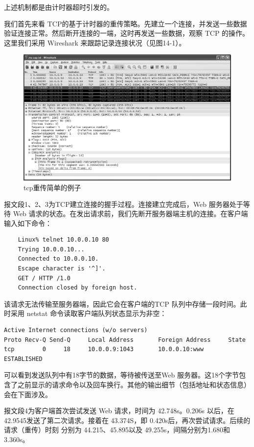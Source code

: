 上述机制都是由计时器超时引发的。

我们首先来看 TCP的基于计时器的重传策略。先建立一个连接，并发送一些数据验证连接正常。然后断开连接的一端，这时再发送一些数据，观察 TCP 的操作。这里我们采用
Wireshark 来跟踪记录连接状况（见图14-1）。

\begin{figure}[!htb]
	\includegraphics[width=1.0\textwidth]{imgs/14/14-1.png}
	\caption{tcp重传简单的例子}
\end{figure}

报文段1、2、3为TCP建立连接的握手过程。连接建立完成后，Web 服务器处于等待 Web 请求的状态。在发出请求前，我们先断开服务器端主机的连接。在客户端输入如下命令：
\begin{verbatim}
    Linux% telnet 10.0.0.10 80
    Trying 10.0.0.10...
    Connected to 10.0.0.10.
    Escape character is '^]'.
    GET / HTTP /1.0
    Connection closed by foreign host.
\end{verbatim}

该请求无法传输至服务器端，因此它会在客户端的TCP 队列中存储一段时间。此时采用 netstat 命令读取客户端队列状态显示为非空：

\begin{verbatim}
Active Internet connections (w/o servers)
Proto Recv-Q Send-Q     Local Address       Foreign Address     State
tcp        0     18     10.0.0.9:1043       10.0.0.10:www       ESTABLISHED
\end{verbatim}

可以看到发送队列中有18字节的数据，等待被传送至Web 服务器。这18个字节包含了之前显示的请求命令以及回车换行。其他的输出细节（包括地址和状态信息）会在下面涉及。

报文段4为客户端首次尝试发送 Web 请求，时间为 42.748s。0.206s 以后，在42.9545发送了第二次请求。接着在 43.374S，即 0.420s后，再次尝试请求。后续的请求（重传）时刻
分别为 44.215、45.895以及 49.255s，间隔分别为1.680和 3.360s。

